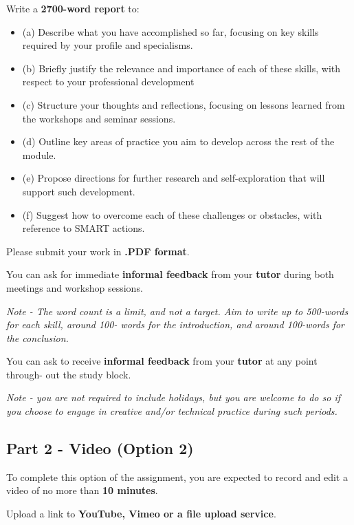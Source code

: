 \documentclass{../../fal_assignment_opendyslexic}
\begin{document}
Write a \textbf{2700-word report} to:
\begin{itemize}
\item(a) Describe what you have accomplished so far, focusing on key skills required by your profile and specialisms.
\item (b) Briefly justify the relevance and importance of each of these skills, with respect to your professional development
\item(c) Structure your thoughts and reflections, focusing on lessons learned from the workshops and seminar sessions.
\item(d) Outline key areas of practice you aim to develop across the rest of the module.
\item(e) Propose directions for further research and self-exploration that will support such development.
\item (f) Suggest how to overcome each of these challenges or obstacles, with reference to SMART actions.
\end{itemize}

Please submit your work in \textbf{.PDF format}.

You can ask for immediate \textbf{informal feedback} from your \textbf{tutor} during both meetings and workshop sessions.

\emph{Note - The word count is a limit, and not a target. Aim to write up to 500-words for each skill, around 100- words for the introduction, and around 100-words for the conclusion.}

You can ask to receive \textbf{informal feedback} from your \textbf{tutor} at any point through- out the study block.

\emph{Note - you are not required to include holidays, but you are welcome to do so if you choose to engage in creative and/or technical practice during such periods.}


\subsection*{Part 2 - Video (Option 2)} 

To complete this option of the assignment, you are expected to record and edit a video of no more than \textbf{10 minutes}. 

Upload a link to \textbf{YouTube, Vimeo or a file upload service}.
\end{document}
